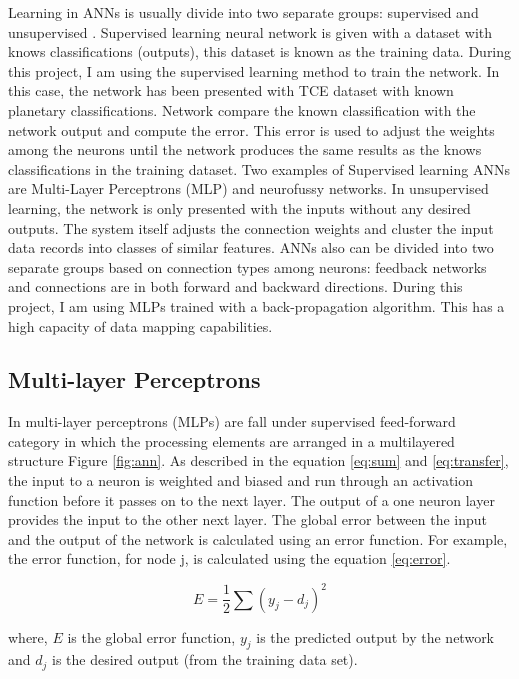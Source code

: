 Learning in ANNs is usually divide into two separate groups: supervised and unsupervised \cite{mcculloch1943logical}.  Supervised learning neural network is given with a dataset with knows classifications (outputs), this dataset is known as the training data. During this project, I am using the supervised learning method to train the network. In this case, the network has been presented with TCE dataset with known planetary classifications. Network compare the known classification with the network output and compute the error. This error is used to adjust the weights among the neurons until the network produces the same results as the knows classifications in the training dataset. Two examples of Supervised learning ANNs are Multi-Layer Perceptrons (MLP) and neurofussy networks. In unsupervised learning, the network is only presented with the inputs without any desired outputs. The system itself adjusts the connection weights and cluster the input data records into classes of similar features.  ANNs also can be divided into two separate groups based on connection types among neurons: feedback networks and connections are in both forward and backward directions. During this project, I am using MLPs trained with a back-propagation algorithm. This has a high capacity of data mapping capabilities. 

\subsection{Multi-layer Perceptrons}
\label{sec:mlp}
In multi-layer perceptrons (MLPs) are fall under supervised feed-forward category in which the processing elements are arranged in a multilayered structure \cite{Introduction_to_the_theory_of_neural_computation} Figure \ref{fig:ann}.  As described in the equation \ref{eq:sum} and \ref{eq:transfer}, the input to a neuron is weighted and biased and run through an activation function before it passes on to the next layer. The output of a one neuron layer provides the input to the other next layer. The global error between the input and the output of the network is calculated using an error function. For example, the error function, for node j, is calculated using the equation \ref{eq:error}.

\begin{equation}
E = \frac{1}{2}\sum{(y_j - d_j)}^{2}
\label{eq:error}
\end{equation} 

where, $E$ is the global error function, $y_j$ is the predicted output by the network and $d_j$ is the desired output (from the training data set).

